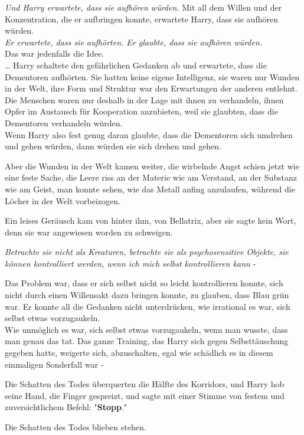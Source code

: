 {\emph{Und Harry erwartete, dass sie aufhören würden.} Mit all dem Willen und der Konzentration, die er aufbringen konnte, erwartete Harry, dass sie aufhören würden.\\ \emph{Er erwartete, dass sie aufhörten. Er glaubte, dass sie aufhören würden.}\\ Das war jedenfalls die Idee.\\ … Harry schaltete den gefährlichen Gedanken ab und erwartete, dass die Dementoren aufhörten. Sie hatten keine eigene Intelligenz, sie waren nur Wunden in der Welt, ihre Form und Struktur war den Erwartungen der anderen entlehnt. Die Menschen waren nur deshalb in der Lage mit ihnen zu verhandeln, ihnen Opfer im Austausch für Kooperation anzubieten, weil sie glaubten, dass die Dementoren verhandeln würden.\\ Wenn Harry also fest genug daran glaubte, dass die Dementoren sich umdrehen und gehen würden, dann würden sie sich drehen und gehen.

Aber die Wunden in der Welt kamen weiter, die wirbelnde Angst schien jetzt wie eine feste Sache, die Leere riss an der Materie wie am Verstand, an der Substanz wie am Geist, man konnte sehen, wie das Metall anfing anzulaufen, während die Löcher in der Welt vorbeizogen.

Ein leises Geräusch kam von hinter ihm, von Bellatrix, aber sie sagte kein Wort, denn sie war angewiesen worden zu schweigen.

\emph{Betrachte sie nicht als Kreaturen, betrachte sie als psychosensitive Objekte, sie können kontrolliert werden, wenn ich mich selbst kontrollieren kann} -

Das Problem war, dass er sich selbst nicht so leicht kontrollieren konnte, sich nicht durch einen Willensakt dazu bringen konnte, zu glauben, dass Blau grün war. Er konnte all die Gedanken nicht unterdrücken, wie irrational es war, sich selbst etwas vorzugaukeln.\\ Wie unmöglich es war, sich selbst etwas vorzugaukeln, wenn man wusste, dass man genau das tat. Das ganze Training, das Harry sich gegen Selbsttäuschung gegeben hatte, weigerte sich, abzuschalten, egal wie schädlich es in diesem einmaligen Sonderfall war -

Die Schatten des Todes überquerten die Hälfte des Korridors, und Harry hob seine Hand, die Finger gespreizt, und sagte mit einer Stimme von festem und zuversichtlichem Befehl: "\textbf{Stopp}."

Die Schatten des Todes blieben stehen.

}
